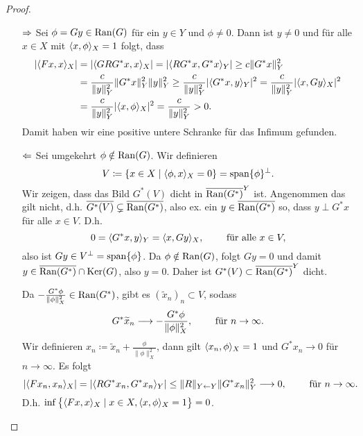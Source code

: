 \begin{proof}\
	\begin{enumerate}
		\item[\glqq{}\(\Rightarrow\)\grqq{}] Sei \(\phi=Gy\in\operatorname{Ran}(G)\) für ein \(y\in Y\) und \(\phi\neq0\). Dann ist \(y\neq0\) und für alle \(x\in X\) mit \(\langle x, \phi\rangle_X=1\) folgt, dass
		\begin{align*}
			|\langle Fx, x\rangle_X|
			& = |\langle GRG^\ast x, x\rangle_X|
			= |\langle RG^\ast x, G^\ast x\rangle_Y|
			\geq c\|G^\ast x\|_Y^2\\
			& = \frac{c}{\|y\|_Y^2}\|G^\ast x\|_Y^2\|y\|_Y^2
			\geq\frac{c}{\|y\|_Y^2}|\langle G^\ast x, y\rangle_Y|^2
			= \frac{c}{\|y\|_Y^2}|\langle x, G y\rangle_X|^2\\
			& = \frac{c}{\|y\|_Y^2}|\langle x, \phi\rangle_X|^2 
			= \frac{c}{\|y\|_Y^2}
			> 0.
		\end{align*}
		Damit haben wir eine positive untere Schranke für das Infimum gefunden.
		
		\item[\glqq{}\(\Leftarrow\)\grqq{}] Sei umgekehrt \(\phi\notin\operatorname{Ran}(G)\). Wir definieren
		\begin{equation*}
			V\coloneqq\{x\in X\mid\langle \phi, x\rangle_X=0\}=\operatorname{span}\{\phi\}^\perp.
		\end{equation*}
		Wir zeigen, dass das Bild  \(G^\ast(V)\) dicht in \(\overline{\operatorname{Ran}(G^\ast)}^Y\) ist. Angenommen das gilt nicht, d.h. \(\overline{G^\ast(V)}\subsetneq\overline{\operatorname{Ran}(G^\ast)}\), also ex. ein \(y\in\overline{\operatorname{Ran}(G^\ast)}\) so, dass \(y\perp G^\ast x\) für alle \(x\in V\). D.h.
		\begin{equation*}
			0=\langle G^\ast x, y\rangle_Y=\langle x, Gy\rangle_X,\qquad\text{ für alle }x\in V,
		\end{equation*}
		also ist \(Gy\in V^\perp=\operatorname{span}\{\phi\}\). Da \(\phi\notin\operatorname{Ran}(G)\), folgt \(Gy=0\) und damit \(y\in\overline{\operatorname{Ran}(G^\ast)}\cap\operatorname{Ker}(G)\), also \(y=0\). Daher ist \(G^\ast(V)\subset\overline{\operatorname{Ran}(G^\ast)}^Y\) dicht.\vspace{1.5mm}
	
		Da \(-\frac{G^\ast\phi}{\|\phi\|_X^2}\in\operatorname{Ran}(G^\ast)\), gibt es \((\widetilde{x}_n)_n\subset V\), sodass
		\begin{equation*}
			G^\ast\widetilde{x}_n\longrightarrow-\frac{G^\ast\phi}{\|\phi\|_X^2},\qquad\text{ für }n\to\infty.
		\end{equation*}
		Wir definieren \(x_n\coloneqq\widetilde{x}_n+\frac{\phi}{\|\phi\|_X^2}\), dann gilt \(\langle x_n, \phi\rangle_X=1\) und \(G^\ast x_n\to0\) für \(n\to\infty\). Es folgt
		\begin{equation*}
			|\langle Fx_n, x_n\rangle_X|
			=|\langle RG^\ast x_n, G^\ast x_n\rangle_Y|
			\leq\|R\|_{Y\leftarrow Y}\|G^\ast x_n\|_Y^2\longrightarrow0,\qquad\text{ für }n\to\infty.
		\end{equation*}
		D.h. \(\inf\big\{\langle Fx, x\rangle_X\mid x\in X,\langle x, \phi\rangle_X=1\big\}=0\).
	\end{enumerate}
\end{proof}
